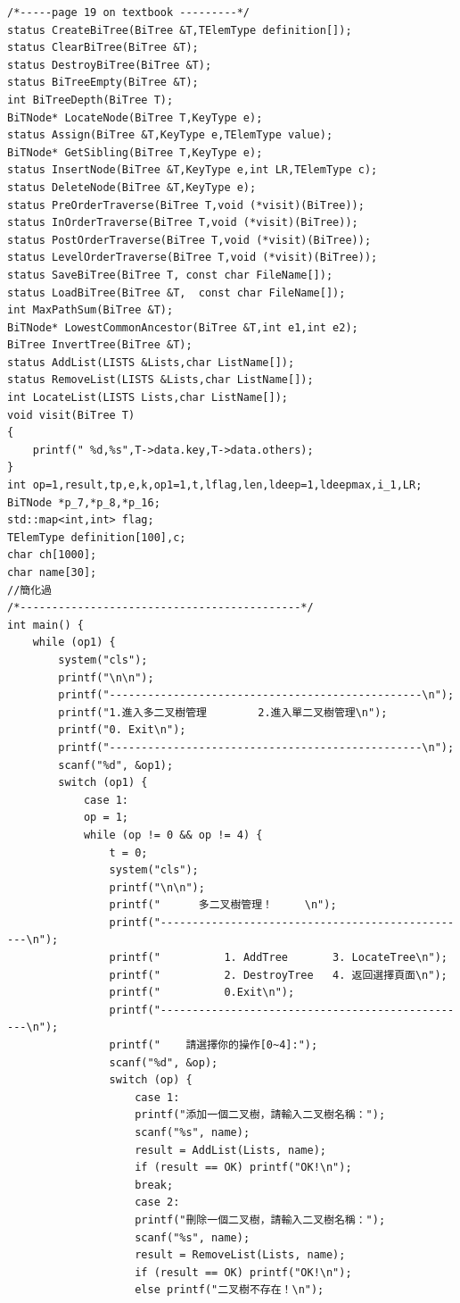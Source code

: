 \documentclass[supercite]{Experimental_Report}
\theoremstyle{definition}
\begin{document}
\begin{lstlisting}[style=commonCodeStyle, caption={目标程序}, label={lst:2-17}]
/*-----page 19 on textbook ---------*/
status CreateBiTree(BiTree &T,TElemType definition[]);
status ClearBiTree(BiTree &T);
status DestroyBiTree(BiTree &T);
status BiTreeEmpty(BiTree &T);
int BiTreeDepth(BiTree T);
BiTNode* LocateNode(BiTree T,KeyType e);
status Assign(BiTree &T,KeyType e,TElemType value);
BiTNode* GetSibling(BiTree T,KeyType e);
status InsertNode(BiTree &T,KeyType e,int LR,TElemType c);
status DeleteNode(BiTree &T,KeyType e);
status PreOrderTraverse(BiTree T,void (*visit)(BiTree));
status InOrderTraverse(BiTree T,void (*visit)(BiTree));
status PostOrderTraverse(BiTree T,void (*visit)(BiTree));
status LevelOrderTraverse(BiTree T,void (*visit)(BiTree));
status SaveBiTree(BiTree T, const char FileName[]);
status LoadBiTree(BiTree &T,  const char FileName[]);
int MaxPathSum(BiTree &T);
BiTNode* LowestCommonAncestor(BiTree &T,int e1,int e2);
BiTree InvertTree(BiTree &T);
status AddList(LISTS &Lists,char ListName[]);
status RemoveList(LISTS &Lists,char ListName[]);
int LocateList(LISTS Lists,char ListName[]);
void visit(BiTree T)
{
	printf(" %d,%s",T->data.key,T->data.others);
}
int op=1,result,tp,e,k,op1=1,t,lflag,len,ldeep=1,ldeepmax,i_1,LR;
BiTNode *p_7,*p_8,*p_16;
std::map<int,int> flag;
TElemType definition[100],c;
char ch[1000];
char name[30];
//簡化過
/*--------------------------------------------*/
int main() {
	while (op1) {
		system("cls");  
		printf("\n\n");
		printf("-------------------------------------------------\n");
		printf("1.進入多二叉樹管理        2.進入單二叉樹管理\n");
		printf("0. Exit\n");
		printf("-------------------------------------------------\n");
		scanf("%d", &op1);   
		switch (op1) {
			case 1:
			op = 1;
			while (op != 0 && op != 4) {
				t = 0;
				system("cls");  
				printf("\n\n");
				printf("      多二叉樹管理！     \n");         
				printf("-------------------------------------------------\n");
				printf("          1. AddTree       3. LocateTree\n");
				printf("          2. DestroyTree   4. 返回選擇頁面\n");       
				printf("          0.Exit\n");   
				printf("-------------------------------------------------\n");
				printf("    請選擇你的操作[0~4]:");        
				scanf("%d", &op);
				switch (op) {
					case 1:
					printf("添加一個二叉樹，請輸入二叉樹名稱：");
					scanf("%s", name);
					result = AddList(Lists, name);                 
					if (result == OK) printf("OK!\n");
					break;
					case 2:
					printf("刪除一個二叉樹，請輸入二叉樹名稱：");
					scanf("%s", name);
					result = RemoveList(Lists, name);                  
					if (result == OK) printf("OK!\n");
					else printf("二叉樹不存在！\n");               

\end{lstlisting}
\end{document}
